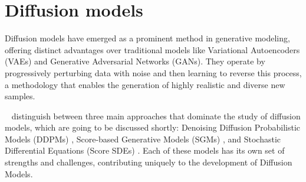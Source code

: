 \section{Diffusion models}\label{diffusion Models}

Diffusion models have emerged as a prominent method in generative modeling, offering distinct advantages over traditional models like Variational Autoencoders (VAEs) and Generative Adversarial Networks (GANs). They operate by progressively perturbing data with noise and then learning to reverse this process, a methodology that enables the generation of highly realistic and diverse new samples.

~\cite{yangdiffusionSummary} distinguish between three main approaches that dominate the study of diffusion models, which are going to be discussed shortly: Denoising Diffusion Probabilistic Models (DDPMs) \citep{hoDDPMs,sohlDDPM}, Score-based Generative Models (SGMs) \citep{song2019SGM}, and Stochastic Differential Equations (Score SDEs) \citep{song2020score, song2021maximum}. Each of these models has its own set of strengths and challenges, contributing uniquely to the development of Diffusion Models.



